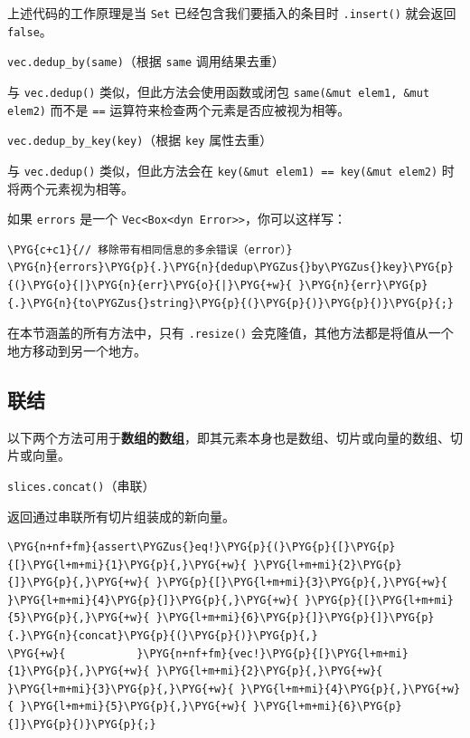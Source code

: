 上述代码的工作原理是当 \texttt{Set} 已经包含我们要插入的条目时 \texttt{.insert()} 就会返回 \texttt{false}。

\begin{myNote}
\texttt{vec.dedup\_by(same)}（根据 \texttt{same} 调用结果去重）
\end{myNote}

与 \texttt{vec.dedup()} 类似，但此方法会使用函数或闭包 \texttt{same(\&mut elem1, \&mut elem2)} 而不是 \texttt{==} 运算符来检查两个元素是否应被视为相等。

\begin{myNote}
\texttt{vec.dedup\_by\_key(key)}（根据 \texttt{key} 属性去重）
\end{myNote}

与 \texttt{vec.dedup()} 类似，但此方法会在 \texttt{key(\&mut elem1) == key(\&mut elem2)} 时将两个元素视为相等。

如果 \texttt{errors} 是一个 \texttt{Vec<Box<dyn Error>>}，你可以这样写：

\begin{Verbatim}[commandchars=\\\{\},breaklines=true,breakanywhere=true,fontsize=\codefont,xleftmargin=17bp]
\PYG{c+c1}{// 移除带有相同信息的多余错误（error）}
\PYG{n}{errors}\PYG{p}{.}\PYG{n}{dedup\PYGZus{}by\PYGZus{}key}\PYG{p}{(}\PYG{o}{|}\PYG{n}{err}\PYG{o}{|}\PYG{+w}{ }\PYG{n}{err}\PYG{p}{.}\PYG{n}{to\PYGZus{}string}\PYG{p}{(}\PYG{p}{)}\PYG{p}{)}\PYG{p}{;}
\end{Verbatim}

在本节涵盖的所有方法中，只有 \texttt{.resize()} 会克隆值，其他方法都是将值从一个地方移动到另一个地方。

\subsection{联结}

以下两个方法可用于\textbf{数组的数组}，即其元素本身也是数组、切片或向量的数组、切片或向量。

\begin{mySidenote}
\texttt{slices.concat()}（串联）
\end{mySidenote}

返回通过串联所有切片组装成的新向量。

\begin{Verbatim}[commandchars=\\\{\},breaklines=true,breakanywhere=true,fontsize=\codefont,xleftmargin=17bp]
\PYG{n+nf+fm}{assert\PYGZus{}eq!}\PYG{p}{(}\PYG{p}{[}\PYG{p}{[}\PYG{l+m+mi}{1}\PYG{p}{,}\PYG{+w}{ }\PYG{l+m+mi}{2}\PYG{p}{]}\PYG{p}{,}\PYG{+w}{ }\PYG{p}{[}\PYG{l+m+mi}{3}\PYG{p}{,}\PYG{+w}{ }\PYG{l+m+mi}{4}\PYG{p}{]}\PYG{p}{,}\PYG{+w}{ }\PYG{p}{[}\PYG{l+m+mi}{5}\PYG{p}{,}\PYG{+w}{ }\PYG{l+m+mi}{6}\PYG{p}{]}\PYG{p}{]}\PYG{p}{.}\PYG{n}{concat}\PYG{p}{(}\PYG{p}{)}\PYG{p}{,}
\PYG{+w}{           }\PYG{n+nf+fm}{vec!}\PYG{p}{[}\PYG{l+m+mi}{1}\PYG{p}{,}\PYG{+w}{ }\PYG{l+m+mi}{2}\PYG{p}{,}\PYG{+w}{ }\PYG{l+m+mi}{3}\PYG{p}{,}\PYG{+w}{ }\PYG{l+m+mi}{4}\PYG{p}{,}\PYG{+w}{ }\PYG{l+m+mi}{5}\PYG{p}{,}\PYG{+w}{ }\PYG{l+m+mi}{6}\PYG{p}{]}\PYG{p}{)}\PYG{p}{;}
\end{Verbatim}

